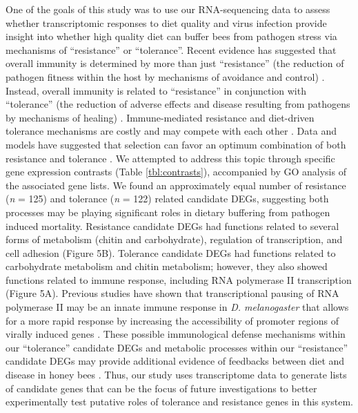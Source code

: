 \documentclass{bmcart}
\begin{document}
\begin{linenumbers}
\begin{doublespacing}
One of the goals of this study was to use our RNA-sequencing data to assess whether transcriptomic responses to diet quality and virus infection provide insight into whether high quality diet can buffer bees from pathogen stress via mechanisms of ``resistance'' or ``tolerance''. Recent evidence has suggested that overall immunity is determined by more than just ``resistance'' (the reduction of pathogen fitness within the host by mechanisms of avoidance and control) \cite{resTol2}. Instead, overall immunity is related to ``resistance'' in conjunction with ``tolerance'' (the reduction of adverse effects and disease resulting from pathogens by mechanisms of healing) \cite{resTol1, resTol2}. Immune-mediated resistance and diet-driven tolerance mechanisms are costly and may compete with each other \cite{resTol1, resTol4}. Data and models have suggested that selection can favor an optimum combination of both resistance and tolerance \cite{resTol5, resTol6, resTol7, resTol8}. We attempted to address this topic through specific gene expression contrasts (Table \ref{tbl:contrasts}), accompanied by GO analysis of the associated gene lists. We found an approximately equal number of resistance (\textit{n} = 125) and tolerance (\textit{n} = 122) related candidate DEGs, suggesting both processes may be playing significant roles in dietary buffering from pathogen induced mortality. Resistance candidate DEGs had functions related to several forms of metabolism (chitin and carbohydrate), regulation of transcription, and cell adhesion (Figure 5B). Tolerance candidate DEGs had functions related to carbohydrate metabolism and chitin metabolism; however, they also showed functions related to immune response, including RNA polymerase II transcription (Figure 5A). Previous studies have shown that transcriptional pausing of RNA polymerase II may be an innate immune response in \textit{D. melanogaster} that allows for a more rapid response by increasing the accessibility of promoter regions of virally induced genes \cite{resTol11}. These possible immunological defense mechanisms within our ``tolerance'' candidate DEGs and metabolic processes within our ``resistance'' candidate DEGs may provide additional evidence of feedbacks between diet and disease in honey bees \cite{AdamTothReview}. Thus, our study uses transcriptome data to generate lists of candidate genes that can be the focus of future investigations to better experimentally test putative roles of tolerance and resistance genes in this system.


\end{doublespacing}
\end{linenumbers}
\end{document}
